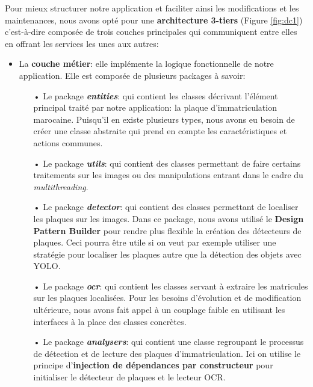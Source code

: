     
    Pour mieux structurer notre application et faciliter ainsi les modifications et les maintenances, nous avons opté pour une \textbf{architecture 3-tiers} (Figure \ref{fig:dc1}) c’est-à-dire composée de trois couches principales qui communiquent entre elles en offrant les services les unes aux autres:
    \begin{itemize}
        \item La \textbf{couche métier}: elle implémente la logique fonctionnelle de notre application. Elle est composée de plusieurs packages à savoir:
            \begin{itemize}
                \item[•] Le package \textbf{\textit{entities}}: qui contient les classes décrivant l'élément principal traité par notre application: la plaque d'immatriculation marocaine. Puisqu'il en existe plusieurs types, nous avons eu besoin de créer une classe abstraite qui prend en compte les caractéristiques et actions communes.
                
                \item[•] Le package \textbf{\textit{utils}}: qui contient des classes permettant de faire certains traitements sur les images ou des manipulations entrant dans le cadre du \textit{multithreading}.
                
                \item[•] Le package \textbf{\textit{detector}}: qui contient des classes permettant de localiser les plaques sur les images. Dans ce package, nous avons utilisé le \textbf{Design Pattern Builder} pour rendre plus flexible la création des détecteurs de plaques. Ceci pourra être utile si on veut par exemple utiliser une stratégie pour localiser les plaques autre que la détection des objets avec YOLO.
                
                \item[•] Le package \textbf{\textit{ocr}}: qui contient les classes servant à extraire les matricules sur les plaques localisées. Pour les besoins d'évolution et de modification ultérieure, nous avons fait appel à un couplage faible en utilisant les interfaces à la place des classes concrètes.
                
                \item[•] Le package \textbf{\textit{analysers}}: qui contient une classe regroupant le processus de détection et de lecture des plaques d'immatriculation. Ici on utilise le principe d'\textbf{injection de dépendances par constructeur} pour initialiser le détecteur de plaques et le lecteur OCR.
                

\end{itemize}
\end{itemize}
